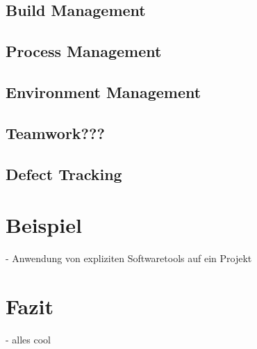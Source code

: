 \documentclass[runningheads,a4paper]{uwsese}
\begin{document}

\subsection{Build Management}
\subsection{Process Management}
\subsection{Environment Management}
\subsection{Teamwork???}
\subsection{Defect Tracking}

\section{Beispiel}
- Anwendung von expliziten Softwaretools auf ein Projekt

\section{Fazit}
- alles cool



\end{document}
